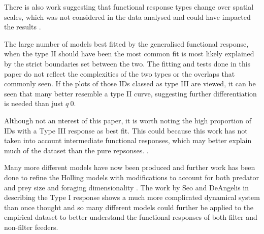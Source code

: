 \documentclass[11pt, a4paper, titlepage]{article}
\begin{document}
There is also work suggesting that functional response types change over spatial scales, which was not considered in the data analysed and could have impacted the results \parencite{Rincon2017}.

The large  number of models best fitted by the generalised functional response, when the type II should have been the most common fit is most likely explained by the strict boundaries set between the two. The fitting and tests done in this paper do not reflect the complexities of the two types or the overlaps that commonly seen. If the plots of those IDs classed as type III are viewed, it can be seen that many better resemble a type II curve, suggesting further differentiation is needed than just $q~0$.

Although not an nterest of this paper, it is worth noting the high proportion of IDs with a Type III response as best fit. This could because this work has not taken into account intermediate functional responses, which may better explain much of the dataset than the pure repsonses. \parencite{Jeschke2004}.

Many more different models have now been produced \parencite{Jeschke2002} and  further work has been done to refine the Holling models \parencite{Pawar2012, Seo2011, Aljetlawi2004} with modifications to account for both predator and prey size \parencite{Aljetlawi2004} and foraging dimensionality \parencite{Pawar2012}. The work by Seo and DeAngelis in describing the Type I response shows a much more complicated dynamical system than once thought \parencite{Seo2011} and so many different models could further be applied to the empirical dataset to better understand the functional responses of both filter and non-filter feeders.

\newpage
\printbibliography
\end{document}
